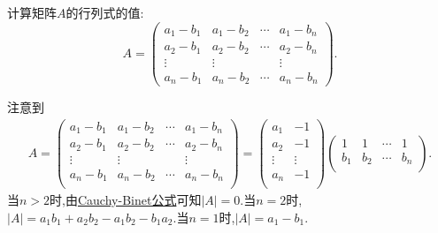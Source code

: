 \documentclass[../../main.tex]{subfiles}%
\begin{document}
\begin{example}
计算矩阵\(A\)的行列式的值:
\[
A = 
\begin{pmatrix}
a_1 - b_1 & a_1 - b_2 & \cdots & a_1 - b_n\\
a_2 - b_1 & a_2 - b_2 & \cdots & a_2 - b_n\\
\vdots & \vdots & & \vdots\\
a_n - b_1 & a_n - b_2 & \cdots & a_n - b_n
\end{pmatrix}.
\]
\end{example}
\begin{solution}

注意到\begin{align*}
A=\left( \begin{matrix}
a_1-b_1&		a_1-b_2&		\cdots&		a_1-b_n\\
a_2-b_1&		a_2-b_2&		\cdots&		a_2-b_n\\
\vdots&		\vdots&		&		\vdots\\
a_n-b_1&		a_n-b_2&		\cdots&		a_n-b_n\\
\end{matrix} \right) =\left( \begin{matrix}
a_1&		-1\\
a_2&		-1\\
\vdots&		\vdots\\
a_n&		-1\\
\end{matrix} \right) \left( \begin{matrix}
1&		1&		\cdots&		1\\
b_1&		b_2&		\cdots&		b_n\\
\end{matrix} \right) .
\end{align*}
当$n>2$时,由\hyperref[theorem:Cauchy-Binet公式]{Cauchy-Binet公式}可知$\left| A \right|=0$.当$n=2$时,$\left| A \right|=a_1b_1+a_2b_2-a_1b_2-b_1a_2$.当$n=1$时,$\left| A \right|=a_1-b_1$.


\end{solution}
\end{document}
